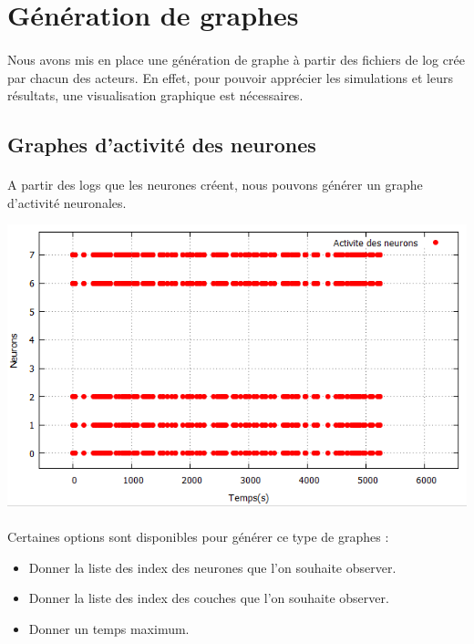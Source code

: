 \documentclass[a4paper,10pt]{article}
\begin{document}
\subsection{}

\newpage

\section{Génération de graphes}

\paragraph{}
Nous avons mis en place une génération de graphe à partir des fichiers de log crée par chacun des acteurs. En effet, pour pouvoir apprécier les simulations et leurs résultats, une visualisation graphique est nécessaires.

\subsection{Graphes d’activité des neurones}
\paragraph{}
A partir des logs que les neurones créent, nous pouvons générer un graphe d’activité neuronales. 

\includegraphics[scale=0.95,right]{image/neuronActivity.png}

\paragraph{}
Certaines options sont disponibles pour générer ce type de graphes :
\begin{itemize}
\item{Donner la liste des index des neurones que l’on souhaite observer.}
\item{Donner la liste des index des couches que l’on souhaite observer.}
\item{Donner un temps maximum.}
\end{itemize}
\end{document}

